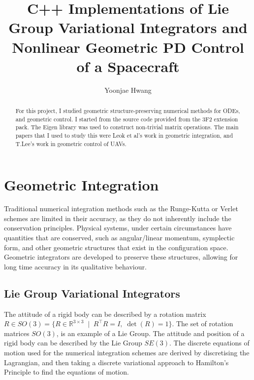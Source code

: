 \documentclass[letterpaper, 9 pt, conference]{ieeeconf}
\title{\LARGE \bf
C++ Implementations of Lie Group Variational Integrators and Nonlinear Geometric PD Control of a Spacecraft
}
\author{Yoonjae Hwang}
\begin{document}
\maketitle
\thispagestyle{empty}
\pagestyle{empty}


\begin{abstract}

For this project, I studied geometric structure-preserving numerical methods for ODEs, 
and geometric control. I started from the source code provided from the 3F2 extension pack. 
The Eigen library was used to construct non-trivial matrix operations. The main papers that I used to study this were Leok et al's work in geometric integration, 
and T.Lee's work in geometric control of UAVs.

\end{abstract}


\section{Geometric Integration}
Traditional numerical integration methods such as the Runge-Kutta or Verlet schemes 
are limited in their accuracy, as they do not inherently include the conservation principles. 
Physical systems, under certain circumstances have quantities that are conserved, such as 
angular/linear momentum, symplectic form, and other geometric structures that exist in the configuration space. 
Geometric integrators are developed to preserve these structures, allowing for long time accuracy in its qualitative behaviour. 

\subsection{Lie Group Variational Integrators}
The attitude of a rigid body can be described by a rotation matrix $R \in SO(3) = \{ R \in \mathbb{R}^{3 \times 3} \;\mid\; R^\top R = I,\; \det(R) = 1 \}$.
The set of rotation matrices $SO(3)$, is an example of a Lie Group. The attitude and position of a rigid body can be described by the Lie Group $SE(3)$.
The discrete equations of motion used for the numerical integration schemes are derived
by discretising the Lagrangian, and then taking a discrete variational approach to Hamilton's Principle 
to find the equations of motion. 
\end{document}

